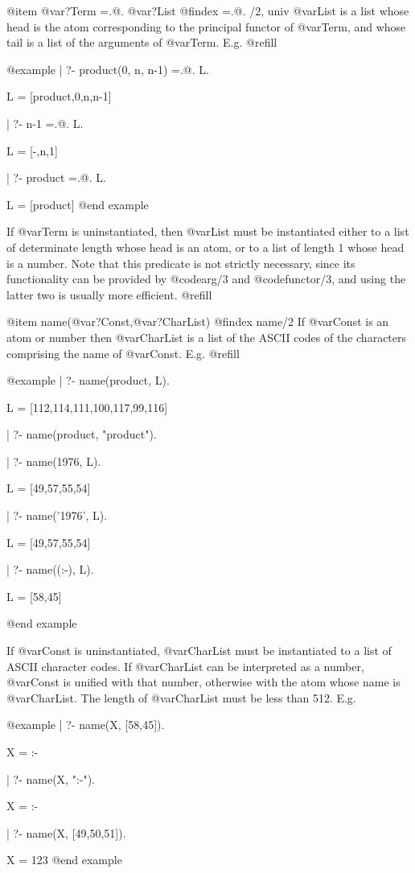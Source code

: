 @item @var{?Term} =.@. @var{?List}
@findex =.@. /2, univ
@var{List} is a list whose head is the atom corresponding to the principal
functor of @var{Term}, and whose tail is a list of the arguments of
@var{Term}.  E.g. @refill

@example
| ?- product(0, n, n-1) =.@. L.

L = [product,0,n,n-1]

| ?- n-1 =.@. L.

L = [-,n,1]

| ?- product =.@. L.

L = [product]
@end example

If @var{Term} is uninstantiated, then @var{List} must be instantiated
either to a list of determinate length whose head is an atom, or to a list
of length 1 whose head is a number.  Note that this predicate is not
strictly necessary, since its functionality can be provided by @code{arg/3}
and @code{functor/3}, and using the latter two is usually more 
efficient. @refill

@item name(@var{?Const},@var{?CharList})
@findex name/2
If @var{Const} is an atom or number then @var{CharList} is a list of the
ASCII codes of the characters comprising the name of @var{Const}.  E.g. @refill

@example
| ?- name(product, L).

L = [112,114,111,100,117,99,116]

| ?- name(product, "product").

| ?- name(1976, L).

L = [49,57,55,54]

| ?- name('1976', L).

L = [49,57,55,54]

| ?- name((:-), L).

L = [58,45]

@end example

If @var{Const} is uninstantiated, @var{CharList} must be instantiated to a
list of ASCII character codes.  If @var{CharList} can be interpreted as a
number, @var{Const} is unified with that number, otherwise with the atom
whose name is @var{CharList}.  The length of @var{CharList} must be less
than 512.  E.g.

@example
| ?- name(X, [58,45]).

X = :-

| ?- name(X, ":-").

X = :-

| ?- name(X, [49,50,51]).

X = 123
@end example

